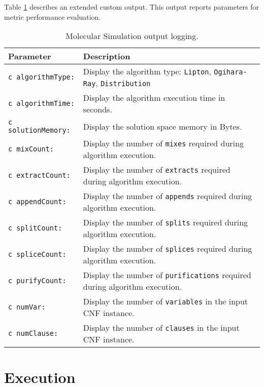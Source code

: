 \FloatBarrier

Table \ref{outputTableDefiniton} describes an extended custom output.  This output reports parameters for metric performance evaluation.
\begin{table}[htdp]
\caption{Molecular Simulation output logging.}
\begin{center}
\begin{tabular}{| l | l |}
\hline
\textbf{Parameter} & \textbf{Description} \\ \hline	
\texttt{c algorithmType:}&	Display the algorithm type: \texttt{Lipton}, \texttt{Ogihara-Ray}, \texttt{Distribution}\\ 
\texttt{c algorithmTime:}&	Display the algorithm execution time in seconds.\\ 
\texttt{c solutionMemory:}& Display the solution space memory in Bytes.	\\ 
\texttt{c mixCount:}	&	Display the number of \texttt{mixes} required during algorithm execution.\\ 
\texttt{c extractCount:}&	Display the number of \texttt{extracts} required during algorithm execution.\\ 
\texttt{c appendCount:}&	Display the number of \texttt{appends} required during algorithm execution.\\ 
\texttt{c splitCount:}	&	Display the number of \texttt{splits} required during algorithm execution.\\ 
\texttt{c spliceCount:}&	Display the number of \texttt{splices} required during algorithm execution.\\ 
\texttt{c purifyCount:}&	Display the number of \texttt{purifications} required during algorithm execution.\\ 
\texttt{c numVar:}	&	Display the number of \texttt{variables} in the input CNF instance.\\ 
\texttt{c numClause:}	&	Display the number of \texttt{clauses} in the input CNF instance.\\ \hline

\end{tabular}
\end{center}
\label{outputTableDefiniton}
\end{table}%
		

\FloatBarrier
			
\section{Execution}
	
